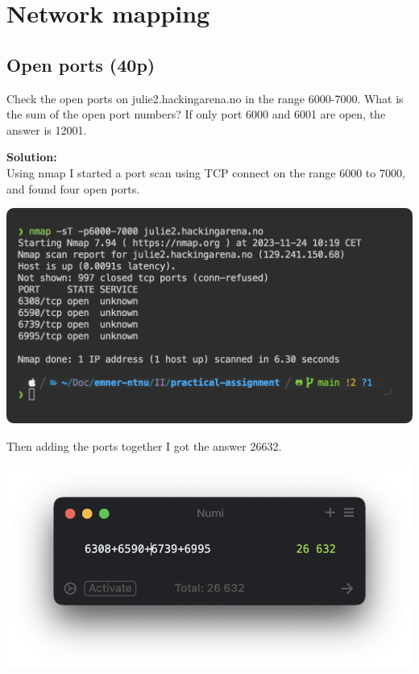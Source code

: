 \section{Network mapping}

\subsection{Open ports (40p)}
\addtocounter{points}{40}
Check the open ports on julie2.hackingarena.no in the range 6000-7000. What is the sum of the open port numbers? If only port 6000 and 6001 are open, the answer is 12001.

\textbf{Solution:}\\
Using nmap I started a port scan using TCP connect on the range 6000 to 7000, and found four open ports.

\begin{center}
    \includegraphics[width=15cm]{img/Network mapping/Open ports/Screenshot 2023-11-24 at 10.21.07.png}
\end{center}

Then adding the ports together I got the answer 26632.

\begin{center}
    \includegraphics[width=15cm]{img/Network mapping/Open ports/Screenshot 2023-11-24 at 10.21.11.png}
\end{center}